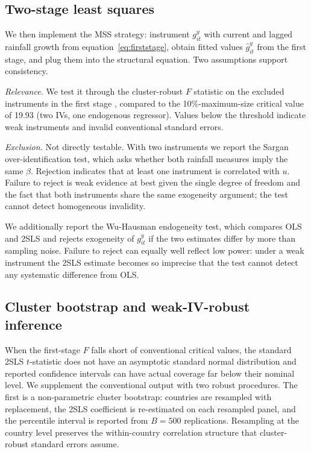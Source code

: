 \documentclass[11pt,a4paper]{article}
\begin{document}
\subsection{Two-stage least squares}\label{sec:2sls}

We then implement the MSS strategy: instrument $g^{y}_{it}$ with
current and lagged rainfall growth from equation~\eqref{eq:firststage},
obtain fitted values $\hat g^{y}_{it}$ from the first stage, and plug
them into the structural equation. Two assumptions support
consistency.

\textit{Relevance.} We test it through the cluster-robust $F$ statistic
on the excluded instruments in the first stage \citep{StaigerStock1997},
compared to the \citet{StockYogo2005} 10\%-maximum-size critical value
of 19.93 (two IVs, one endogenous regressor). Values below the
threshold indicate weak instruments and invalid conventional standard
errors.

\textit{Exclusion.} Not directly testable. With two instruments we
report the Sargan over-identification test, which asks whether both
rainfall measures imply the same $\beta$. Rejection indicates that at
least one instrument is correlated with $u$. Failure to reject is weak
evidence at best given the single degree of freedom and the fact that
both instruments share the same exogeneity argument; the test cannot
detect homogeneous invalidity.

We additionally report the Wu-Hausman endogeneity test, which compares
OLS and 2SLS and rejects exogeneity of $g^{y}_{it}$ if the two
estimates differ by more than sampling noise. Failure to reject can
equally well reflect low power: under a weak instrument the 2SLS
estimate becomes so imprecise that the test cannot detect any
systematic difference from OLS.

\subsection{Cluster bootstrap and weak-IV-robust inference}\label{sec:boot}

When the first-stage $F$ falls short of conventional critical values,
the standard 2SLS $t$-statistic does not have an asymptotic standard
normal distribution and reported confidence intervals can have actual
coverage far below their nominal level. We supplement the conventional
output with two robust procedures. The first is a non-parametric
cluster bootstrap: countries are resampled with replacement, the 2SLS
coefficient is re-estimated on each resampled panel, and the percentile
interval is reported from $B = 500$ replications. Resampling at the
country level preserves the within-country correlation structure that
cluster-robust standard errors assume.
\end{document}
